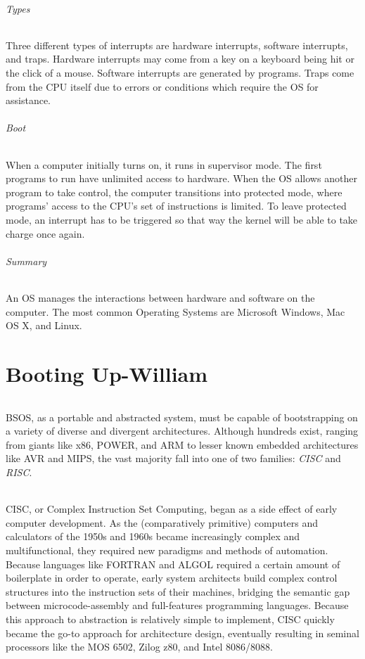 \documentclass[english]{paper}
\begin{document}
\paragraph{Types}
Three different types of interrupts are hardware interrupts, software interrupts, and traps. Hardware interrupts may come from a key on a keyboard being hit or the click of a mouse. Software interrupts are generated by programs. Traps come from the CPU itself due to errors or conditions which require the OS for assistance.

\paragraph{Boot}
When a computer initially turns on, it runs in supervisor mode. The first programs to run have unlimited access to hardware. When the OS allows another program to take control, the computer transitions into protected mode, where programs' access to the CPU's set of instructions is limited. To leave protected mode, an interrupt has to be triggered so that way the kernel will be able to take charge once again.

\paragraph{Summary}
An OS manages the interactions between hardware and software on the computer. The most common Operating Systems are Microsoft Windows, Mac OS X, and Linux.

\part{Booting Up-William}
\paragraph{}
BSOS, as a portable and abstracted system, must be capable of bootstrapping on a variety of diverse and divergent architectures. Although hundreds exist, ranging from giants like x86, POWER, and ARM to lesser known embedded architectures like AVR and MIPS, the vast majority fall into one of two families: \textit{CISC} and \textit{RISC}.

\paragraph{}
CISC, or Complex Instruction Set Computing, began as a side effect of early computer development. As the (comparatively primitive) computers and calculators of the 1950s and 1960s became increasingly complex and multifunctional, they required new paradigms and methods of automation. Because languages like FORTRAN and ALGOL required a certain amount of boilerplate in order to operate, early system architects build complex control structures into the instruction sets of their machines, bridging the semantic gap between microcode-assembly and full-features programming languages. Because this approach to abstraction is relatively simple to implement, CISC quickly became the go-to approach for architecture design, eventually resulting in seminal processors like the MOS 6502, Zilog z80, and Intel 8086/8088.
\end{document}
